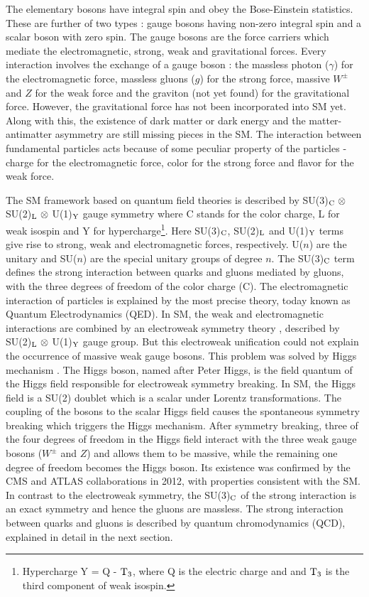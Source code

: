 The elementary bosons have integral spin and obey the Bose-Einstein statistics. These are further of two types : gauge bosons having non-zero integral spin and a scalar boson with zero spin. The gauge bosons are the force carriers which mediate the electromagnetic, strong, weak and gravitational forces. Every interaction involves the exchange of a gauge boson : the massless photon ($\gamma$) for the electromagnetic force, massless gluons ($g$) for the strong force, massive $W^\pm$ and $Z$ for the weak force and the graviton (not yet found) for the gravitational force. However, the gravitational force has not been incorporated into SM yet. Along with this, the existence of dark matter or dark energy and the matter-antimatter asymmetry are still missing pieces in the SM. The interaction between fundamental particles acts because of some peculiar property of the particles - charge for the electromagnetic force, color for the strong force and flavor for the weak force. 

The SM framework based on quantum field theories \cite{Peskin:1995ev} is described by SU(3)$_{\rm C}~\otimes$ SU(2)$_{\rm L}~\otimes$ U(1)$_{\rm Y}$ gauge symmetry where C stands for the color charge, L for weak isospin and Y for hypercharge\footnote{Hypercharge Y = Q - ${\rm T}_{3}$, where Q is the electric charge and and ${\rm T}_{3}$ is the third component of weak isospin.}. Here SU(3)$_{\rm C}$, SU(2)$_{\rm L}$ and U(1)$_{\rm Y}$ terms give rise to strong, weak and electromagnetic forces, respectively. U($n$) are the unitary and SU($n$) are the special unitary groups of degree $n$. The SU(3)$_{\rm C}$ term defines the strong interaction between quarks and gluons mediated by gluons, with the three degrees of freedom of the color charge (C). The electromagnetic interaction of particles is explained by the most precise theory, today known as Quantum Electrodynamics (QED). In SM, the weak and electromagnetic interactions are combined by an electroweak symmetry theory \cite{Glashow:1979pj,Salam:1980jd}, described by SU(2)$_{\rm L}~\otimes$ U(1)$_{\rm Y}$ gauge group. But this electroweak unification could not explain the occurrence of massive weak gauge bosons. This problem was solved by Higgs mechanism \cite{Higgs:1964pj,Englert:1964et}. The Higgs boson, named after Peter Higgs, is the field quantum of the Higgs field responsible for electroweak symmetry breaking. In SM, the Higgs field is a SU(2) doublet which is a scalar under Lorentz transformations. The coupling of the bosons to the scalar Higgs field causes the spontaneous symmetry breaking which triggers the Higgs mechanism. After symmetry breaking, three of the four degrees of freedom in the Higgs field interact with the three weak gauge bosons ($W^\pm$ and $Z$) and allows them to be massive, while the remaining one degree of freedom becomes the Higgs boson. Its existence was confirmed by the CMS \cite{Chatrchyan:2012xdj} and ATLAS \cite{Aad:2012tfa} collaborations in 2012, with properties consistent with the SM. In contrast to the electroweak symmetry, the SU(3)$_{\rm C}$ of the strong interaction is an exact symmetry and hence the gluons are massless. The strong interaction between quarks and gluons is described by quantum chromodynamics (QCD), explained in detail in the next section.%

